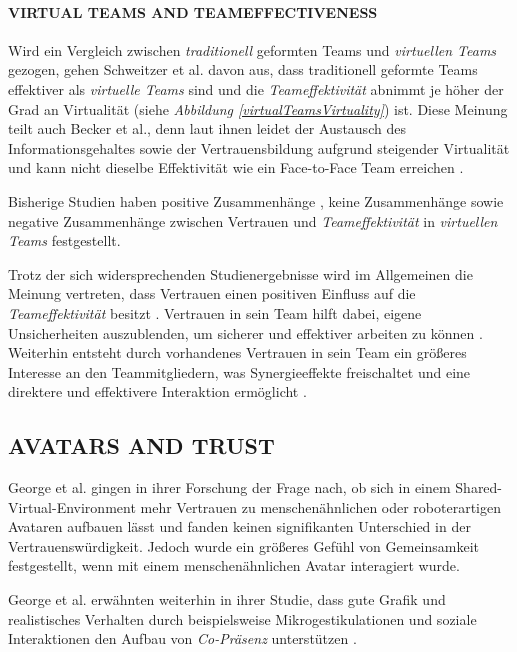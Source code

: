 \documentclass[sigchi]{acmart}
\begin{document}
\paragraph{VIRTUAL TEAMS AND TEAMEFFECTIVENESS}

Wird ein Vergleich zwischen \textit{traditionell} geformten Teams und \textit{virtuellen Teams} gezogen, gehen Schweitzer et al. \citep{schweitzer2010conceptualizing} davon aus, dass traditionell geformte Teams effektiver als \textit{virtuelle Teams} sind und die \textit{Teameffektivität} abnimmt je höher der Grad an Virtualität (siehe \textit{Abbildung \ref{virtualTeamsVirtuality}}) ist.
Diese Meinung teilt auch Becker et al., denn laut ihnen leidet der Austausch des Informationsgehaltes sowie der Vertrauensbildung aufgrund steigender Virtualität und kann nicht dieselbe Effektivität wie ein Face-to-Face Team erreichen \citep{becker2002fuhrung}.

Bisherige Studien haben positive Zusammenhänge \citep{davis2000trusted}, keine Zusammenhänge \citep{hertel2004managing} sowie negative Zusammenhänge \citep{dirks1999effects} zwischen Vertrauen und \textit{Teameffektivität} in \textit{virtuellen Teams} festgestellt.

Trotz der sich widersprechenden Studienergebnisse wird im Allgemeinen die Meinung vertreten, dass Vertrauen einen positiven Einfluss auf die \textit{Teameffektivität} besitzt \citep{de2016trust}. 
Vertrauen in sein Team hilft dabei, eigene Unsicherheiten auszublenden, um sicherer und effektiver arbeiten zu können \citep{de2010does}. Weiterhin entsteht durch vorhandenes Vertrauen in sein Team ein größeres Interesse an den Teammitgliedern, was Synergieeffekte freischaltet und eine direktere und effektivere Interaktion ermöglicht \citep{dirks1999effects}. 

\subsection{AVATARS AND TRUST}
George et al. \citep{george2018trusting} gingen in ihrer Forschung der Frage nach, ob sich in einem Shared-Virtual-Environment mehr Vertrauen zu menschenähnlichen oder roboterartigen Avataren aufbauen lässt und
fanden keinen signifikanten Unterschied in der Vertrauenswürdigkeit. Jedoch wurde ein größeres Gefühl von Gemeinsamkeit festgestellt, wenn mit einem menschenähnlichen Avatar interagiert wurde.

George et al. erwähnten weiterhin in ihrer Studie, dass gute Grafik und realistisches Verhalten durch beispielsweise Mikrogestikulationen und soziale Interaktionen den Aufbau von \textit{Co-Präsenz} unterstützen \citep{george2018trusting}.
\end{document}
